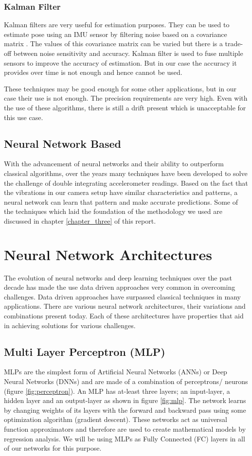 \subsubsection{Kalman Filter}
Kalman filters are very useful for estimation purposes. They can be used to estimate pose using an IMU sensor by filtering noise based on a covariance matrix \citep{ferdinando2012embedded}. The values of this covariance matrix can be varied but there is a trade-off between noise sensitivity and accuracy. Kalman filter is used to fuse multiple sensors to improve the accuracy of estimation. But in our case the accuracy it provides over time is not enough and hence cannot be used.

These techniques may be good enough for some other applications, but in our case their use is not enough. The precision requirements are very high. Even with the use of these algorithms, there is still a drift present which is unacceptable for this use case.

\subsection{Neural Network Based}
With the advancement of neural networks and their ability to outperform classical algorithms, over the years many techniques have been developed to solve the challenge of double integrating accelerometer readings. Based on the fact that the vibrations in our camera setup have similar characteristics and patterns, a neural network can learn that pattern and make accurate predictions. Some of the techniques which laid the foundation of the methodology we used are discussed in chapter \ref{chapter_three} of this report.


\section{Neural Network Architectures}
The evolution of neural networks and deep learning techniques over the past decade has made the use data driven approaches very common in overcoming challenges. Data driven approaches have surpassed classical techniques in many applications. There are various neural network architectures, their variations and combinations present today. Each of these architectures have properties that aid in achieving solutions for various challenges.

\subsection{Multi Layer Perceptron (MLP)}
MLPs are the simplest form of Artificial Neural Networks (ANNs) or Deep Neural Networks (DNNs) and are made of a combination of perceptrons/ neurons (figure \ref{fig:perceptron}). An MLP has at-least three layers; an input-layer, a hidden layer and an output-layer as shown in figure \ref{fig:mlp}. The network learns by changing weights of its layers with the forward and backward pass using some optimization algorithm (gradient descent). These networks act as universal function approximators \citep{cybenko1989approximation} and therefore are used to create mathematical models by regression analysis. We will be using MLPs as Fully Connected (FC) layers in all of our networks for this purpose.

